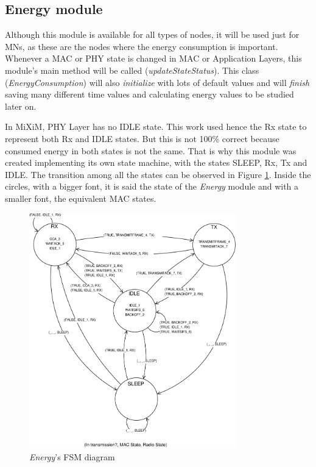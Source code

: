 \subsection{Energy module}

Although this module is available for all types of nodes, it will be used just for \acp{MN}, as these are the nodes where the energy 
consumption is important. Whenever a \ac{MAC} or \ac{PHY} state is 
changed in \ac{MAC} or Application Layers, this module's main method will be called (\textit{updateStateStatus}). This class 
(\textit{EnergyConsumption}) will also \textit{initialize} with lots of default values and will \textit{finish} saving many different 
time values and calculating energy values to be studied later on.

In \ac{MiXiM}, \ac{PHY} Layer has no IDLE state. This work used hence the \ac{Rx} state to represent both \ac{Rx} and IDLE states. But this is
not 100\% correct because consumed energy in both states is not the same. That is why this module was created implementing its own state machine,
with the states SLEEP, \ac{Rx}, \ac{Tx} and IDLE. The transition among all the states can be observed in Figure \ref{fig:statesDiagramEnergy}. 
Inside the circles, with a bigger font, it is said the state of the \textit{Energy} module and with a smaller font, the equivalent \ac{MAC} 
states.

\begin{figure}[ht]
 \begin{center}
  \includegraphics[width=0.8\textwidth]{statesDiagramEnergy.eps}
 \end{center}
 \caption{\textit{Energy}'s \ac{FSM} diagram}
 \label{fig:statesDiagramEnergy}
\end{figure}

